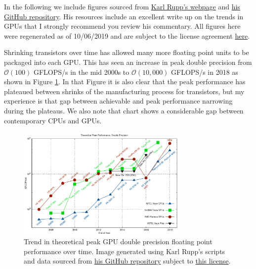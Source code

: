 \begin{tcolorbox}[width=\textwidth,colback={lightgray},title={Acknowledgement of source for CPU/GPU performance trend data and figures},colbacktitle=yellow,coltitle=blue] 
In the following we include figures sourced from \href{https://www.karlrupp.net/2013/06/cpu-gpu-and-mic-hardware-characteristics-over-time/}{Karl Rupp's webpage} and \href{https://github.com/karlrupp/cpu-gpu-mic-comparison}{his GitHub repository}. His resources include an excellent write up on the trends in GPUs that I strongly recommend you review his commentary. All figures here were regenerated as of 10/06/2019 and are subject to the license agreement \href{https://github.com/karlrupp/cpu-gpu-mic-comparison/blob/master/LICENSE.txt}{here}.
\end{tcolorbox}

Shrinking transistors over time has allowed many more floating point units to be packaged into each GPU. This has seen an increase in peak double precision from  $\mathcal{O}(100)$ GFLOPS/s in the mid 2000s to $\mathcal{O}(10,000)$ GFLOPS/s in 2018 as shown in Figure \ref{GPUFP64trends.fig}. In that Figure it is also clear that the peak performance has plateaued between shrinks of the manufacturing process for transistors, but my experience is that gap between achievable and peak performance narrowing during the plateaus. We also note that chart shows a considerable gap between contemporary CPUs and GPUs.
\begin{figure}[htbp!]
    \centering
    \includegraphics[width=0.75\textwidth]{figures/L24/gflops-dp.pdf}
    \caption{Trend in theoretical peak GPU double precision floating point performance over time. Image generated using Karl Rupp's scripts and data sourced from \href{https://github.com/karlrupp/cpu-gpu-mic-comparison}{his GitHub repository} subject to \href{https://github.com/karlrupp/cpu-gpu-mic-comparison/blob/master/LICENSE.txt}{this license}. }
    \label{GPUFP64trends.fig}
\end{figure}

